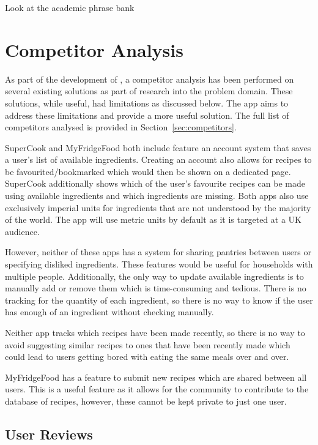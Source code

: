 {    Look at the academic phrase bank
}

\section{Competitor Analysis}\label{sec:competitor_analysis}

As part of the development of \chef{}, a competitor analysis has been performed on several existing solutions as part of research
into the problem domain. These solutions, while useful, had limitations as discussed below. The \chef{} app aims to address
these limitations and provide a more useful solution. The full list of competitors analysed is provided in Section~\ref{sec:competitors}.

SuperCook and MyFridgeFood both include feature an account system
that saves a user's list of available ingredients. Creating an account also allows for recipes to be favourited/bookmarked
which would then be shown on a dedicated page. SuperCook additionally shows which of the user's favourite recipes
can be made using available ingredients and which ingredients are missing. Both apps also use exclusively imperial
units for ingredients that are not understood by the majority of the world. The \chef{} app will use metric units by default
as it is targeted at a UK audience.

However, neither of these apps has a system for sharing pantries between users or specifying disliked ingredients. These features would be useful for households with multiple people.
Additionally, the only way to update available ingredients is to manually add or remove them which is time-consuming and tedious. There is no tracking for the quantity of
each ingredient, so there is no way to know if the user has enough of an ingredient without checking manually.

Neither app tracks which recipes have been made recently, so there is no way to avoid suggesting similar recipes to ones that have been recently made which could lead to
users getting bored with eating the same meals over and over.

MyFridgeFood has a feature to submit new recipes which are shared between all users. This is a useful feature as it allows for the community to contribute to the database
of recipes, however, these cannot be kept private to just one user.

\subsection{User Reviews}

